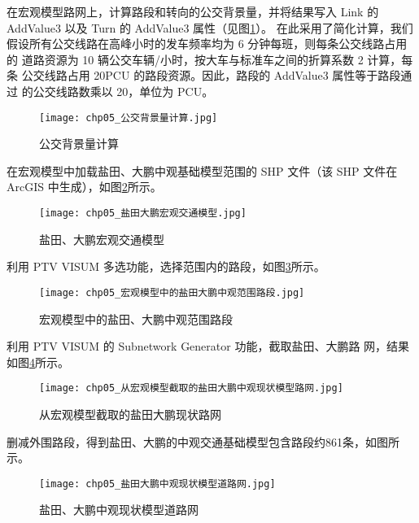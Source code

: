 \begin{nbeae}
\item 在宏观模型路网上，计算路段和转向的公交背景量，并将结果写入
Link 的 AddValue3 以及 Turn 的 AddValue3 属性（见图\ref{fig:chp05_公交背景量计算}）。
在此采用了简化计算，我们假设所有公交线路在高峰小时的发车频率均为 6 分钟每班，则每条公交线路占用的
道路资源为 10 辆公交车辆/小时，按大车与标准车之间的折算系数 2 计算，每条
公交线路占用 20PCU 的路段资源。因此，路段的 AddValue3 属性等于路段通过
的公交线路数乘以 20，单位为 PCU。
\begin{figure}[!ht]
  \centering
  \texttt{[image: chp05\_公交背景量计算.jpg]}
  \caption{公交背景量计算\label{fig:chp05_公交背景量计算} }
\end{figure}

\item 在宏观模型中加载盐田、大鹏中观基础模型范围的 SHP 文件（该 SHP
文件在 ArcGIS 中生成），如图\ref{fig:chp05_盐田大鹏宏观交通模型}所示。
\begin{figure}[!ht]
  \centering
  \texttt{[image: chp05\_盐田大鹏宏观交通模型.jpg]}
  \caption{盐田、大鹏宏观交通模型\label{fig:chp05_盐田大鹏宏观交通模型} }
\end{figure}

\item 利用 PTV VISUM 多选功能，选择范围内的路段，如图\ref{fig:chp05_宏观模型中的盐田大鹏中观范围路段}所示。
\begin{figure}[!ht]
  \centering
  \texttt{[image: chp05\_宏观模型中的盐田大鹏中观范围路段.jpg]}
  \caption{宏观模型中的盐田、大鹏中观范围路段\label{fig:chp05_宏观模型中的盐田大鹏中观范围路段} }
\end{figure}

\item 利用 PTV VISUM 的 Subnetwork Generator 功能，截取盐田、大鹏路
网，结果如图\ref{fig:chp05_从宏观模型截取的盐田大鹏现状路网}所示。
\begin{figure}[!ht]
  \centering
  \texttt{[image: chp05\_从宏观模型截取的盐田大鹏中观现状模型路网.jpg]}
  \caption{从宏观模型截取的盐田大鹏现状路网\label{fig:chp05_从宏观模型截取的盐田大鹏现状路网} }
\end{figure}

\item 删减外围路段，得到盐田、大鹏的中观交通基础模型包含路段约861条，如图所示。
\begin{figure}[!ht]
  \centering
  \texttt{[image: chp05\_盐田大鹏中观现状模型道路网.jpg]}
  \caption{盐田、大鹏中观现状模型道路网\label{fig:chp05_盐田大鹏中观现状模型道路网} }
\end{figure}
\end{nbeae}

